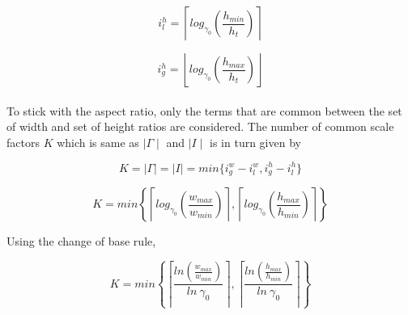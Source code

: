 \begin{equation}
i^h_l = \left \lceil log_{\gamma_0} \left ( \frac{h_{min}}{h_t} \right ) \right \rceil
\label{eq5}
\end{equation}

\begin{equation}
i^h_g = \left \lfloor log_{\gamma_0} \left ( \frac{h_{max}}{h_t} \right ) \right \rfloor
\label{eq6}
\end{equation}


\paragraph{}
To stick with the aspect ratio, only the terms that are common between the set of width and set of height ratios are considered. The number of common scale factors $K$ which is same as  $\mid \Gamma \mid$ and $\mid I \mid$ is in turn given by

\begin{equation}
K = \mid \Gamma \mid = \mid I \mid = min \{ i_g^w - i_l^w, i_g^h - i_l^h \}
\label{eq7}
\end{equation}

\begin{equation}
K = min \left \{ \left \lceil log_{\gamma_0} \left ( \frac{w_{max}}{w_{min}} \right ) \right \rceil , \left \lceil log_{\gamma_0} \left ( \frac{h_{max}}{h_{min}} \right ) \right \rceil \right \}
\label{eq8}
\end{equation}

Using the change of base rule,

\begin{equation}
K = min \left \{ \left \lceil \frac{ln \left ( \frac{w_{max}}{w_{min}} \right )}{ln\  \gamma_0}  \right \rceil , \left \lceil \frac{ln \left ( \frac{h_{max}}{h_{min}} \right )}{ln \ \gamma_0}  \right \rceil \right \}
\label{eq9}
\end{equation}


